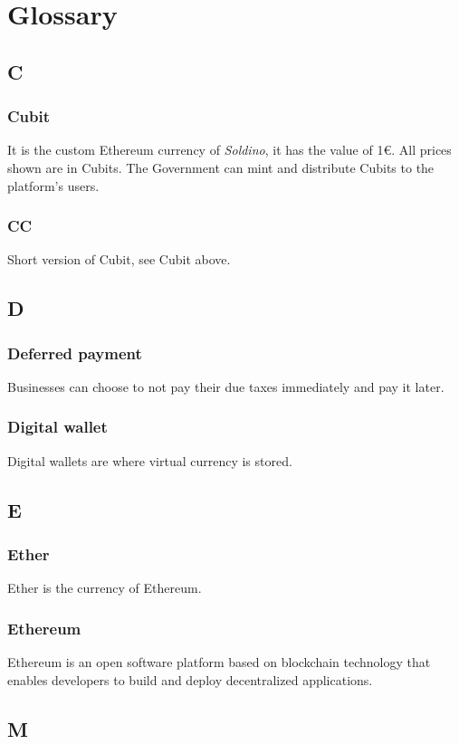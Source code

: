 \section{Glossary}
	\subsection*{C}
		\subsubsection*{Cubit}
		It is the custom Ethereum currency of \textit{Soldino}, it has the value 
		of 1\euro. All prices shown are in Cubits. The Government can mint 
		and distribute Cubits to the platform's users.
		\subsubsection*{CC}
		Short version of Cubit, see Cubit above.
	
	\subsection*{D}
		\subsubsection*{Deferred payment}
		Businesses can choose to not pay their due taxes immediately and pay it 
		later.
		\subsubsection*{Digital wallet}
		Digital wallets are where virtual currency is stored.
	
	\subsection*{E}
		\subsubsection*{Ether}
		Ether is the currency of Ethereum.
		\subsubsection*{Ethereum}
		Ethereum is an open software platform based on blockchain technology 
		that enables developers to build and deploy decentralized applications.
	\subsection*{M}
